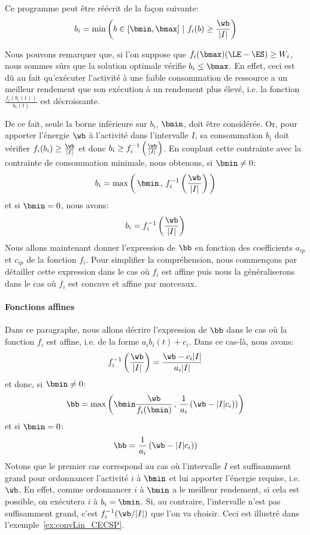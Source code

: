 Ce programme peut être réécrit de la façon suivante: 
\[ b_i=\min\left( b \in [\bmin,\bmax]\ |\ f_i(b) \ge
    \frac{\wb}{|I|}\right)
\]

Nous pouvons remarquer que, si l'on suppose que $f_i(\bmax) (\LE - \ES
) \ge W_i$, nous sommes sûrs que la solution optimale vérifie $b_i \le
\bmax$. En effet, ceci est dû au fait qu'exécuter l'activité à une
faible consommation de ressource a un meilleur rendement que son
exécution à un rendement plus élevé, i.e. la fonction
$\frac{f_i(b_i(t))}{b_i(t)}$ est décroissante. 

De ce fait, seule la borne inférieure sur $b_i$, $\bmin$, doit être
considérée. Or, pour apporter l'énergie $\wb$ à l'activité dans
l'intervalle $I$, sa consommation $b_i$ doit vérifier $f_i(b_i) \ge
\frac{\wb}{|I|}$ et donc $b_i \ge
f_i^{-1}\left(\frac{\wb}{|I|}\right)$. En couplant cette contrainte
avec la contrainte de consommation minimale, nous obtenons, si $\bmin
\neq 0$:
\[
  b_i= \max\left(\, \bmin \, ,\, 
    f_i^{-1}\left(\frac{\wb}{|I|}\right)\, \right)
\]
et si $\bmin = 0$, nous avons:
\[
  b_i=  f_i^{-1}\left(\frac{\wb}{|I|}\right)
\]
Nous allons maintenant donner l'expression de $\bb$  en fonction des
coefficients $a_{ip}$  et $c_{ip}$ de la fonction $f_i$. Pour
simplifier la compréhension, nous commençons par détailler cette
expression dans le cas où $f_i$ est affine puis nous la généraliserons
dans le cas où $f_i$ est concave et affine par morceaux. 

\paragraph{Fonctions affines}

Dans ce paragraphe, nous allons décrire l'expression de $\bb$ dans le
cas où la fonction $f_i$ est affine, i.e. de la forme $a_ib_i(t)+c_i$. Dans
ce cas-là, nous avons:  
\[f_i^{-1}\left( \frac{\wb}{|I|}\right)= \frac{ \wb- c_i|I|}{a_i|I|}
\]
et donc, si $\bmin\neq 0$: 
\begin{equation}
  \bb= \max\left(\bmin \frac{\wb}{f_i(\bmin)} \, ,\,  
    \frac{1}{a_i}\left(\wb-|I|c_{i})\right)\right)
\end{equation}
et si $\bmin=0$: 
\[
  \bb=  \frac{1}{a_i}\left(\wb-|I|c_{i})\right)
\]
Notons que le premier cas correspond au cas où l'intervalle $I$ est
suffisamment grand pour ordonnancer l'activité $i$ à $\bmin$ et lui
apporter l'énergie requise, i.e. $\wb$. En effet, comme ordonnancer
$i$ à $\bmin$ a le meilleur rendement, si cela est possible, on
exécutera $i$ à $b_i=\bmin$. Si, au contraire, l'intervalle n'est pas
suffisamment grand, c'est $f_i^{-1}(\wb/|I|) $ que l'on va
choisir. Ceci est illustré dans l'exemple~\ref{ex:convLin_CECSP}.

